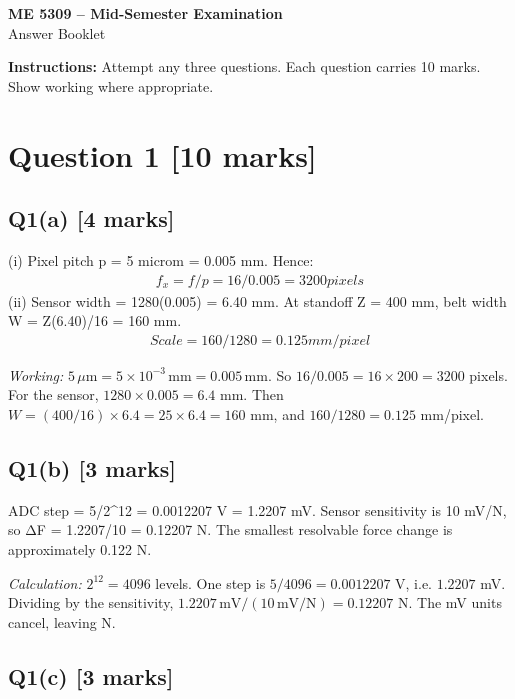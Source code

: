 \documentclass[11pt,a4paper]{article}
\begin{document}
\begin{center}
{\Large\bfseries ME 5309 -- Mid-Semester Examination}\\[3pt]
{\large Answer Booklet}\\[8pt]
\end{center}
\textbf{Instructions:} Attempt any three questions. Each question carries 10 marks. Show working where appropriate.
\section*{Question 1 \hfill [10 marks]}
\subsection*{Q1(a) \hfill [4 marks]}

(i) Pixel pitch p = 5 microm = 0.005 mm.
Hence:\[\begin{aligned}f_x = f/p = 16/0.005 = 3200 pixels\end{aligned}\]
(ii) Sensor width = 1280(0.005) = 6.40 mm.
At standoff Z = 400 mm, belt width W = Z(6.40)/16 = 160 mm.
\[\begin{aligned}Scale = 160/1280 = 0.125 mm/pixel\end{aligned}\]\par\smallskip\textit{Working:} $5\,\mu\mathrm{m}=5\times10^{-3}\,\mathrm{mm}=0.005\,\mathrm{mm}$. So $16/0.005=16\times200=3200$ pixels. For the sensor, $1280\times0.005=6.4$ mm. Then $W=(400/16)\times6.4=25\times6.4=160$ mm, and $160/1280=0.125$ mm/pixel.

\subsection*{Q1(b) \hfill [3 marks]}

ADC step = 5/2\textasciicircum{}12 = 0.0012207 V = 1.2207 mV.
Sensor sensitivity is 10 mV/N, so ΔF = 1.2207/10 = 0.12207 N.
The smallest resolvable force change is approximately 0.122 N.\par\smallskip\textit{Calculation:} $2^{12}=4096$ levels. One step is $5/4096=0.0012207$ V, i.e. $1.2207$ mV. Dividing by the sensitivity, $1.2207\,\mathrm{mV}/(10\,\mathrm{mV/N})=0.12207$ N. The mV units cancel, leaving N.

\subsection*{Q1(c) \hfill [3 marks]}
\end{document}

